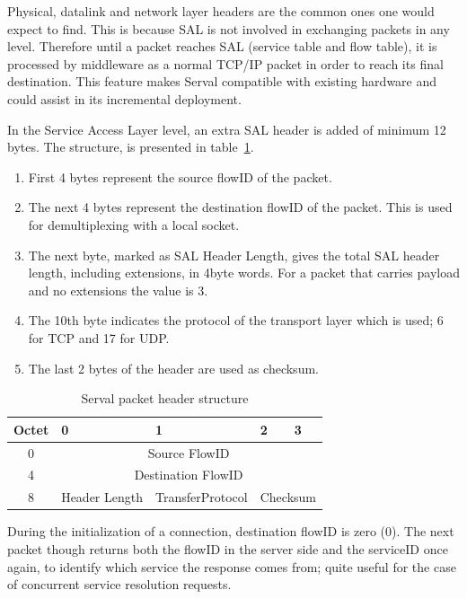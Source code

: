 Physical, datalink and network layer headers are the common ones one would expect to find.
This is because SAL is not involved in exchanging packets in any level.
Therefore until a packet reaches SAL (service table and flow table), it is processed by middleware as a normal TCP/IP packet in order to reach its final destination.
This feature makes Serval compatible with existing hardware and could assist in its incremental deployment.

In the Service Access Layer level, an extra SAL header is added of minimum 12 bytes.
The structure, is presented in table~\ref{table:salheader}.
\begin{enumerate} \itemsep1pt \parskip0pt 
  \item First 4 bytes represent the source flowID of the packet.
  \item The next 4 bytes represent the destination flowID of the packet.
  This is used for demultiplexing with a local socket.
  \item The next byte, marked as SAL Header Length, gives the total SAL header length, including extensions, in 4byte words.
  For a packet that carries payload and no extensions the value is 3.
  \item The 10th byte indicates the protocol of the transport layer which is used; 6 for TCP and 17 for UDP.
  \item The last 2 bytes of the header are used as checksum.
\end{enumerate}

\begin{table}
\begin{center}
  \begin{tabularx}{\linewidth}{|c|X|X|X|X|}
  	\hline
  	Octet &	0 & 1 & 2 & 3 \\ \hline
  	0 & \multicolumn{4}{c|}{Source FlowID}\\ \hline
  	4 & \multicolumn{4}{c|}{Destination FlowID}\\ \hline
  	8 &	Header Length & {Transfer\linebreak Protocol} &	\multicolumn{2}{|c|}{Checksum}	\\
	\hline
  \end{tabularx}
  \caption[Serval packet header structure]{Serval packet header structure}
  \label{table:salheader}
\end{center}
\end{table}

During the initialization of a connection, destination flowID is zero (0).
The next packet though returns both the flowID in the server side and the serviceID once again, to identify which service the response comes from; quite useful for the case of concurrent service resolution requests.

